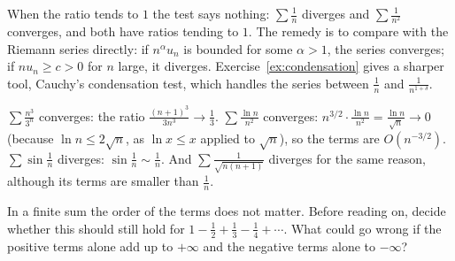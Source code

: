 When the ratio tends to $1$ the test says nothing: $\sum\frac1n$ diverges and $\sum\frac1{n^2}$ converges, and both have ratios tending to $1$. The
remedy is to compare with the Riemann series directly: if $n^\alpha u_n$ is bounded for some $\alpha>1$, the series converges; if $nu_n\ge c>0$ for $n$
large, it diverges. Exercise~\ref{ex:condensation} gives a sharper tool, Cauchy's condensation test, which handles the series between $\frac1n$ and $\frac1{n^{1+\delta}}$.

\begin{examplex}
$\sum\frac{n^3}{3^n}$ converges: the ratio $\frac{(n+1)^3}{3n^3}\to\frac13$. $\sum\frac{\ln n}{n^2}$ converges: $n^{3/2}\cdot\frac{\ln n}{n^2}=\frac{\ln n}{\sqrt n}\to0$ (because $\ln n\le2\sqrt n$, as $\ln x\le x$ applied to $\sqrt n$), so the terms are $O(n^{-3/2})$. $\sum\sin\frac1n$ diverges: $\sin\frac1n\sim\frac1n$. And $\sum\frac1{\sqrt{n(n+1)}}$ diverges for the same reason, although its terms are smaller than $\frac1n$.
\end{examplex}

\begin{think}
In a finite sum the order of the terms does not matter. Before reading on, decide whether this should still hold for $1-\frac12+\frac13-\frac14+\cdots$. What could go wrong if the positive terms alone add up to $+\infty$ and the negative terms alone to $-\infty$?
\end{think}

